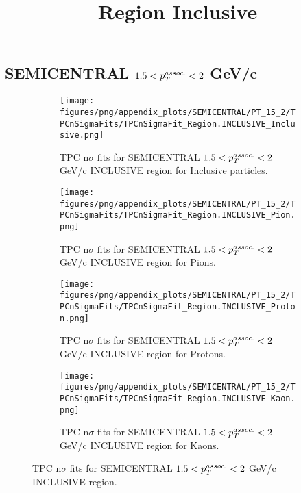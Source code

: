     
            \subsection{SEMICENTRAL $1.5 < \pTassoc < 2$ GeV/c}
            \begin{figure}[H]
                \title{Region Inclusive}
                \begin{subfigure}[b]{0.5\textwidth}
                    \centering
                    \texttt{[image: figures/png/appendix\_plots/SEMICENTRAL/PT\_15\_2/TPCnSigmaFits/TPCnSigmaFit\_Region.INCLUSIVE\_Inclusive.png]}
                    \caption{TPC n$\sigma$ fits for SEMICENTRAL $1.5 < \pTassoc < 2$ GeV/c INCLUSIVE region for Inclusive particles.}
                    \label{fig:appendix_SEMICENTRAL_$1.5 < \pTassoc < 2$ GeV/c_INCLUSIVE_Inclusive}
                \end{subfigure}
                \begin{subfigure}[b]{0.5\textwidth}
                    \centering
                    \texttt{[image: figures/png/appendix\_plots/SEMICENTRAL/PT\_15\_2/TPCnSigmaFits/TPCnSigmaFit\_Region.INCLUSIVE\_Pion.png]}
                    \caption{TPC n$\sigma$ fits for SEMICENTRAL $1.5 < \pTassoc < 2$ GeV/c INCLUSIVE region for Pions.}
                    \label{fig:appendix_SEMICENTRAL_$1.5 < \pTassoc < 2$ GeV/c_INCLUSIVE_Pion}
                \end{subfigure}
                \begin{subfigure}[b]{0.5\textwidth}
                    \centering
                    \texttt{[image: figures/png/appendix\_plots/SEMICENTRAL/PT\_15\_2/TPCnSigmaFits/TPCnSigmaFit\_Region.INCLUSIVE\_Proton.png]}
                    \caption{TPC n$\sigma$ fits for SEMICENTRAL $1.5 < \pTassoc < 2$ GeV/c INCLUSIVE region for Protons.}
                    \label{fig:appendix_SEMICENTRAL_$1.5 < \pTassoc < 2$ GeV/c_INCLUSIVE_Proton}
                \end{subfigure}
                \begin{subfigure}[b]{0.5\textwidth}
                    \centering
                    \texttt{[image: figures/png/appendix\_plots/SEMICENTRAL/PT\_15\_2/TPCnSigmaFits/TPCnSigmaFit\_Region.INCLUSIVE\_Kaon.png]}
                    \caption{TPC n$\sigma$ fits for SEMICENTRAL $1.5 < \pTassoc < 2$ GeV/c INCLUSIVE region for Kaons.}
                    \label{fig:appendix_SEMICENTRAL_$1.5 < \pTassoc < 2$ GeV/c_INCLUSIVE_Kaon}
                \end{subfigure}
                \caption{TPC n$\sigma$ fits for SEMICENTRAL $1.5 < \pTassoc < 2$ GeV/c INCLUSIVE region.}
                \label{fig:appendix_SEMICENTRAL_$1.5 < \pTassoc < 2$ GeV/c_INCLUSIVE}
            \end{figure}
